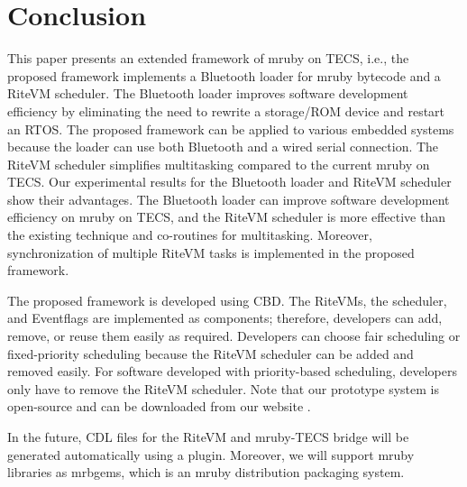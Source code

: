 \documentclass[conference]{IEEEtran/IEEEtran/IEEEtran}
\begin{document}
 
\section{Conclusion}
\label{sec:Conclusion}
This paper presents an extended framework of mruby on TECS, i.e., the proposed framework implements a Bluetooth loader for mruby bytecode and a RiteVM scheduler.
The Bluetooth loader improves software development efficiency by eliminating the need to rewrite a storage/ROM device and restart an RTOS.
The proposed framework can be applied to various embedded systems because the loader can use both Bluetooth and a wired serial connection.
The RiteVM scheduler simplifies multitasking compared to the current mruby on TECS.
Our experimental results for the Bluetooth loader and RiteVM scheduler show their advantages.
The Bluetooth loader can improve software development efficiency on mruby on TECS, and the RiteVM scheduler is more effective than the existing technique and co-routines for multitasking.
Moreover, synchronization of multiple RiteVM tasks is implemented in the proposed framework.

The proposed framework is developed using CBD.
The RiteVMs, the scheduler, and Eventflags are implemented as components; therefore, developers can add, remove, or reuse them easily as required.
Developers can choose fair scheduling or fixed-priority scheduling because the RiteVM scheduler can be added and removed easily.
For software developed with priority-based scheduling, developers only have to remove the RiteVM scheduler.
Note that our prototype system is open-source and can be downloaded from our website \cite{url:download}.

In the future, CDL files for the RiteVM and mruby-TECS bridge will be generated automatically using a plugin.
Moreover, we will support mruby libraries as mrbgems, which is an mruby distribution packaging system.



\end{document}
